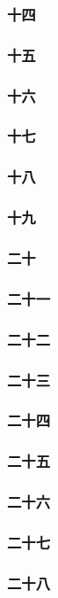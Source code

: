 \subsubsection*{十四}
\subsubsection*{十五}
\subsubsection*{十六}
\subsubsection*{十七}
\subsubsection*{十八}
\subsubsection*{十九}
\subsubsection*{二十}
\subsubsection*{二十一}
\subsubsection*{二十二}
\subsubsection*{二十三}
\subsubsection*{二十四}
\subsubsection*{二十五}
\subsubsection*{二十六}
\subsubsection*{二十七}
\subsubsection*{二十八}
